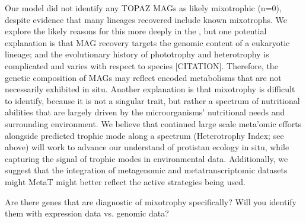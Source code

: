 \documentclass[12pt]{article}
\numberwithin{equation}{section}
\begin{document}
Our model did not identify any TOPAZ MAGs as likely mixotrophic (n=0), despite evidence that many lineages recovered include known mixotrophs. We explore the likely reasons for this more deeply in the , but one potential explanation is that MAG recovery targets the genomic content of a eukaryotic lineage; and the evolutionary history of phototrophy and heterotrophy is complicated and varies with respect to species [CITATION]. Therefore, the genetic composition of MAGs may reflect encoded metabolisms that are not necessarily exhibited in situ. Another explanation is that mixotrophy is difficult to identify, because it is not a singular trait, but rather a spectrum of nutritional abilities that are largely driven by the microorganisms' nutritional needs and surrounding environment. We believe that continued large scale meta'omic efforts alongside predicted trophic mode along a spectrum (Heterotrophy Index; see above) will work to advance our understand of protistan ecology in situ, while capturing the signal of trophic modes in environmental data. Additionally, we suggest that the integration of metagenomic and metatranscriptomic datasets might MetaT might better reflect the active strategies being used. 


Are there genes that are diagnostic of mixotrophy specifically? Will you identify them with expression data vs. genomic data? 
\end{document}

